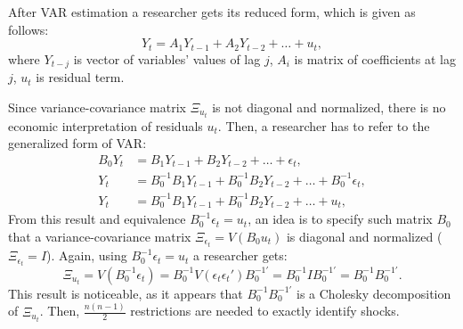 \documentclass[12pt, a4paper]{extarticle}
\begin{document}
After VAR estimation a researcher gets its reduced form, which is given as follows:
\begin{equation}
	Y_t = A_1 Y_{t-1}  + A_2 Y_{t-2} + \ldots + u_t,
\end{equation}
where $Y_{t-j}$ is vector of variables' values of lag $j$, $A_i$ is matrix of coefficients at lag $j$, $u_t$ is residual term.

Since variance-covariance matrix $\Xi_{u_t}$ is not diagonal and normalized, there is no economic interpretation of residuals $u_t$. Then, a researcher has to refer to the generalized form of VAR:
\begin{align}
	B_0 Y_t &= B_1 Y_{t-1}  + B_2 Y_{t-2} + \ldots + \epsilon_t,\\
	Y_t &= B_0^{-1}B_1 Y_{t-1}  + B_0^{-1}B_2 Y_{t-2} + \ldots + B_0^{-1} \epsilon_t,\\
	Y_t &= B_0^{-1}B_1 Y_{t-1}  + B_0^{-1}B_2 Y_{t-2} + \ldots + u_t,
\end{align}
From this result and equivalence $B_0^{-1} \epsilon_t = u_t$, an idea is to specify such matrix $B_0$ that a variance-covariance matrix $\Xi_{\epsilon_t} = V(B_0 u_t)$ is diagonal and normalized ($\Xi_{\epsilon_t} = I$). Again, using $B_0^{-1} \epsilon_t = u_t$ a researcher gets:
\begin{equation}
	\Xi_{u_t} = V(B_0^{-1} \epsilon_t) = B_0^{-1} V(\epsilon_t \epsilon_t') B_0^{-1'} = B_0^{-1} I B_0^{-1'} = B_0^{-1} B_0^{-1'}.
\end{equation}
This result is noticeable, as it appears that $B_0^{-1} B_0^{-1'}$ is a Cholesky decomposition of $\Xi_{u_t}$. Then, $\displaystyle\frac{n(n-1)}{2}$ restrictions are needed to exactly identify shocks.
\end{document}
